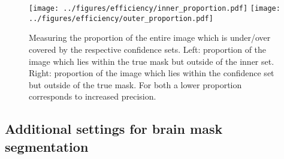 \begin{figure}[h!]
	\begin{center}
		\texttt{[image: ../figures/efficiency/inner\_proportion.pdf]}
		\quad\quad
		\texttt{[image: ../figures/efficiency/outer\_proportion.pdf]}
	\end{center}
	\caption{Measuring the proportion of the entire image which is under/over covered by the respective confidence sets. Left: proportion of the image which lies within the true mask but outside of the inner set. Right: proportion of the image which lies within the confidence set but outside of the true mask. For both a lower proportion corresponds to increased precision. }\label{fig:efficiency2}
\end{figure}

\newpage
\subsection{Additional settings for brain mask segmentation}

